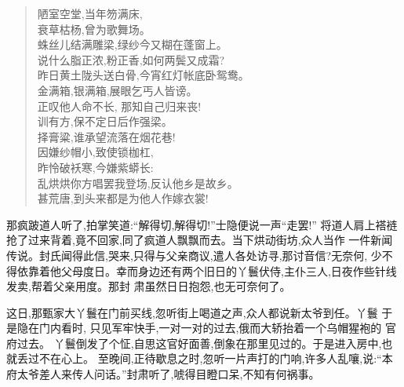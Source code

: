 \documentclass[nofonts]{ctexbook}
\newcommand*{\wei}{\CJKfamily{xinwei}}    %
\begin{document}
\begin{verse} \wei
    陋室空堂,当年笏满床,\\
    衰草枯杨,曾为歌舞场。\\
    蛛丝儿结满雕梁,绿纱今又糊在蓬窗上。\\
    说什么脂正浓,粉正香,如何两鬓又成霜?\\
    昨日黄土陇头送白骨,今宵红灯帐底卧鸳鸯。\\
    金满箱,银满箱,展眼乞丐人皆谤。\\
    正叹他人命不长, 那知自己归来丧!\\
    训有方,保不定日后作强梁。\\
    择膏粱,谁承望流落在烟花巷!\\
    因嫌纱帽小,致使锁枷杠,\\
    昨怜破袄寒,今嫌紫蟒长:\\
    乱烘烘你方唱罢我登场,反认他乡是故乡。\\
    甚荒唐,到头来都是为他人作嫁衣裳!
\end{verse}

    那疯跛道人听了,拍掌笑道:``解得切,解得切!''士隐便说一声``走罢!''
将道人肩上褡裢抢了过来背着,竟不回家,同了疯道人飘飘而去。当下烘动街坊,众人当作
一件新闻传说。封氏闻得此信,哭来,只得与父亲商议,遣人各处访寻,那讨音信?无奈何,
少不得依靠着他父母度日。幸而身边还有两个旧日的丫鬟伏侍,主仆三人,日夜作些针线
发卖,帮着父亲用度。那封 肃虽然日日抱怨,也无可奈何了。

    这日,那甄家大丫鬟在门前买线,忽听街上喝道之声,众人都说新太爷到任。丫鬟
于是隐在门内看时, 只见军牢快手,一对一对的过去,俄而大轿抬着一个乌帽猩袍的
官府过去。 丫鬟倒发了个怔,自思这官好面善,倒象在那里见过的。于是进入房中,也
就丢过不在心上。 至晚间,正待歇息之时,忽听一片声打的门响,许多人乱嚷,说:``本
府太爷差人来传人问话。''封肃听了,唬得目瞪口呆,不知有何祸事。

\clearpage
\end{document}
